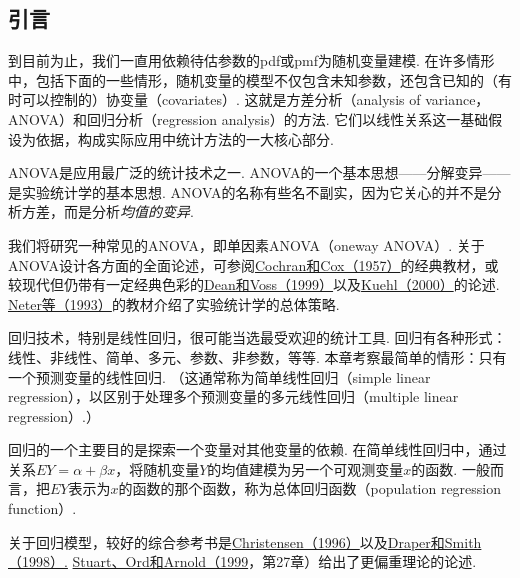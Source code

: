 \subsection{引言}\label{sec:11.1}
到目前为止，我们一直用依赖待估参数的pdf或pmf为随机变量建模. 在许多情形中，包括下面的一些情形，随机变量的模型不仅包含未知参数，还包含已知的（有时可以控制的）协变量（covariates）. 这就是方差分析（analysis of variance，ANOVA）和回归分析（regression analysis）的方法. 它们以线性关系这一基础假设为依据，构成实际应用中统计方法的一大核心部分.

ANOVA是应用最广泛的统计技术之一. ANOVA的一个基本思想——分解变异——是实验统计学的基本思想. ANOVA的名称有些名不副实，因为它关心的并不是分析方差，而是分析\emph{均值的变异}.

我们将研究一种常见的ANOVA，即单因素ANOVA（oneway ANOVA）. 关于ANOVA设计各方面的全面论述，可参阅\hyperref[bib:source82]{Cochran和Cox（1957）}的经典教材，或较现代但仍带有一定经典色彩的\hyperref[bib:source94]{Dean和Voss（1999）}以及\hyperref[bib:source192]{Kuehl（2000）}的论述. \hyperref[bib:source232]{Neter等（1993）}的教材介绍了实验统计学的总体策略.

回归技术，特别是线性回归，很可能当选最受欢迎的统计工具. 回归有各种形式：线性、非线性、简单、多元、参数、非参数，等等. 本章考察最简单的情形：只有一个预测变量的线性回归. （这通常称为简单线性回归（simple linear regression），以区别于处理多个预测变量的多元线性回归（multiple linear regression）.）

回归的一个主要目的是探索一个变量对其他变量的依赖. 在简单线性回归中，通过关系$EY=\alpha+\beta x$，将随机变量$Y$的均值建模为另一个可观测变量$x$的函数. 一般而言，把$EY$表示为$x$的函数的那个函数，称为总体回归函数（population regression function）.

关于回归模型，较好的综合参考书是\hyperref[bib:source75]{Christensen（1996）}以及\hyperref[bib:source102]{Draper和Smith（1998\mbox{）.}} \hyperref[bib:source311]{Stuart、Ord和Arnold（1999}，第27章）给出了更偏重理论的论述.

